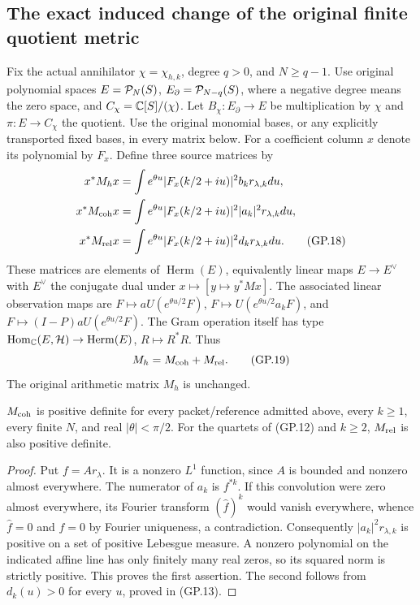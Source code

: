 \subsection{The exact induced change of the original finite quotient metric}
Fix the actual annihilator $\chi=\chi_{h,k}$, degree $q>0$, and
$N\geq q-1$. Use original polynomial spaces
$E=\mathcal P_N(S)$, $E_\partial=\mathcal P_{N-q}(S)$, where a negative degree
means the zero space, and $C_\chi=\mathbb C[S]/(\chi)$. Let
$B_\chi:E_\partial\to E$ be multiplication by $\chi$ and
$\pi:E\to C_\chi$ the quotient. Use the original monomial bases,
or any explicitly transported fixed bases, in every matrix below.
For a coefficient column $x$ denote its polynomial by $F_x$.
Define three source matrices by
\begin{align}
 x^*M_hx&=\int e^{\theta u}|F_x(k/2+iu)|^2b_k r_{\lambda,k}du,
 \nonumber\\
 x^*M_{\rm coh}x&=\int e^{\theta u}|F_x(k/2+iu)|^2|a_k|^2r_{\lambda,k}du,
 \nonumber\\
 x^*M_{\rm rel}x&=\int e^{\theta u}|F_x(k/2+iu)|^2d_kr_{\lambda,k}du.
 \tag{GP.18}
\end{align}
These matrices are elements of $\operatorname{Herm}(E)$, equivalently
linear maps $E\to E^\vee$ with $E^\vee$ the conjugate dual under
$x\mapsto[y\mapsto y^*Mx]$. The associated linear observation maps are
$F\mapsto aU(e^{\theta u/2}F)$,
$F\mapsto U(e^{\theta u/2}a_kF)$, and
$F\mapsto (I-P)aU(e^{\theta u/2}F)$.
The Gram operation itself has type
$\operatorname{Hom}_{\mathbb C}(E,\mathcal H)\to\operatorname{Herm}(E)$,
$R\mapsto R^*R$. Thus
\begin{equation}
 M_h=M_{\rm coh}+M_{\rm rel}.
 \tag{GP.19}
\end{equation}
The original arithmetic matrix $M_h$ is unchanged.

\begin{lemma}
$M_{\rm coh}$ is positive definite for every packet/reference admitted
above, every $k\geq1$, every finite $N$, and real $|\theta|<\pi/2$.
For the quartets of (GP.12) and $k\geq2$, $M_{\rm rel}$ is also
positive definite.
\end{lemma}
\begin{proof}
Put $f=Ar_\lambda$. It is a nonzero $L^1$ function, since $A$ is
bounded and nonzero almost everywhere. The numerator of $a_k$ is
$f^{*k}$. If this convolution were zero almost everywhere, its
Fourier transform $(\widehat f)^k$ would vanish everywhere, whence
$\widehat f=0$ and $f=0$ by Fourier uniqueness, a contradiction.
Consequently $|a_k|^2r_{\lambda,k}$ is positive on a set of positive
Lebesgue measure. A nonzero polynomial on the indicated affine line
has only finitely many real zeros, so its squared norm is strictly
positive. This proves the first assertion. The second follows
from $d_k(u)>0$ for every $u$, proved in (GP.13).
\end{proof}

